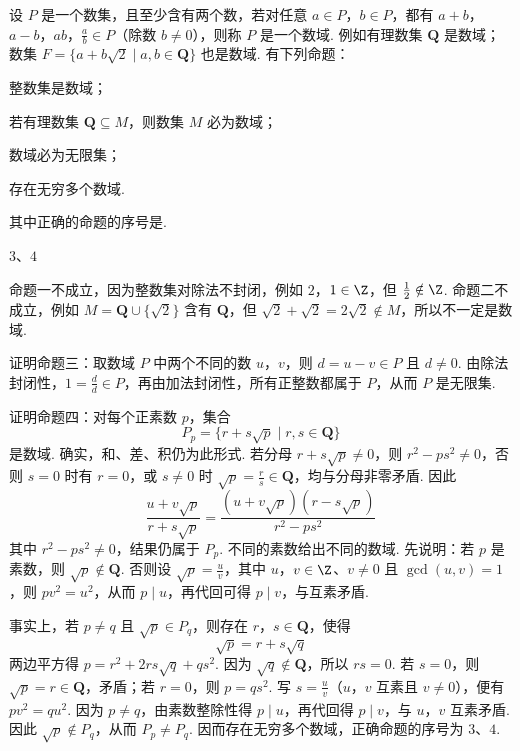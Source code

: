 \begin{problem}
设 \(P\) 是一个数集，且至少含有两个数，若对任意 \(a\in P\)，\(b \in P\)，都有 \(a + b\)，\(a - b\)，\(ab\)，\(\frac{a}{b} \in P\)（除数 \(b \neq 0\)），则称 \(P\) 是一个数域. 例如有理数集 \(\mathbf{Q}\) 是数域；数集 \(F = \{a + b\sqrt{2} \mid a, b \in \mathbf{Q}\}\) 也是数域. 有下列命题：

\begin{circlelist}
\item 整数集是数域；
\item 若有理数集 \(\mathbf{Q} \subseteq M\)，则数集 \(M\) 必为数域；
\item 数域必为无限集；
\item 存在无穷多个数域.
\end{circlelist}

其中正确的命题的序号是\fillinblank{}.
\begin{answer}
\(3\)、\(4\)
\end{answer}
\begin{solution}
命题一不成立，因为整数集对除法不封闭，例如 \(2\)，\(1\in\Z\)，但 \(\frac{1}{2}\notin\Z\). 命题二不成立，例如 \(M=\mathbf Q\cup\{\sqrt2\}\) 含有 \(\mathbf Q\)，但 \(\sqrt2+\sqrt2=2\sqrt2\notin M\)，所以不一定是数域.

证明命题三：取数域 \(P\) 中两个不同的数 \(u\)，\(v\)，则 \(d=u-v\in P\) 且 \(d\neq0\). 由除法封闭性，\(1=\frac{d}{d}\in P\)，再由加法封闭性，所有正整数都属于 \(P\)，从而 \(P\) 是无限集.

证明命题四：对每个正素数 \(p\)，集合
\[
P_p=\{r+s\sqrt p\mid r,s\in\mathbf Q\}
\]
是数域. 确实，和、差、积仍为此形式. 若分母 \(r+s\sqrt p\neq0\)，则 \(r^2-ps^2\neq0\)，否则 \(s=0\) 时有 \(r=0\)，或 \(s\neq0\) 时 \(\sqrt p=\frac{r}{s}\in\mathbf{Q}\)，均与分母非零矛盾. 因此
\[
\frac{u+v\sqrt p}{r+s\sqrt p}=\frac{(u+v\sqrt p)(r-s\sqrt p)}{r^2-ps^2}
\]
其中 \(r^2-ps^2\neq0\)，结果仍属于 \(P_p\). 不同的素数给出不同的数域. 先说明：若 \(p\) 是素数，则 \(\sqrt p\notin\mathbf{Q}\). 否则设 \(\sqrt p=\frac{u}{v}\)，其中 \(u\)，\(v\in\Z\)、\(v\neq0\) 且 \(\gcd(u,v)=1\)，则 \(pv^2=u^2\)，从而 \(p\mid u\)，再代回可得 \(p\mid v\)，与互素矛盾.

事实上，若 \(p\neq q\) 且 \(\sqrt p\in P_q\)，则存在 \(r\)，\(s\in\mathbf{Q}\)，使得
\[
\sqrt p=r+s\sqrt q
\]
两边平方得 \(p=r^2+2rs\sqrt q+qs^2\). 因为 \(\sqrt q\notin\mathbf{Q}\)，所以 \(rs=0\). 若 \(s=0\)，则 \(\sqrt p=r\in\mathbf{Q}\)，矛盾；若 \(r=0\)，则 \(p=qs^2\). 写 \(s=\frac{u}{v}\)（\(u\)，\(v\) 互素且 \(v\neq0\)），便有 \(pv^2=qu^2\). 因为 \(p\neq q\)，由素数整除性得 \(p\mid u\)，再代回得 \(p\mid v\)，与 \(u\)，\(v\) 互素矛盾. 因此 \(\sqrt p\notin P_q\)，从而 \(P_p\neq P_q\). 因而存在无穷多个数域，正确命题的序号为 \(3\)、\(4\).
\end{solution}
\end{problem}


